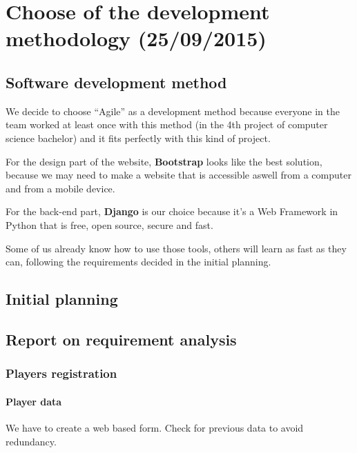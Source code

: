\section{Choose of the development methodology (25/09/2015)}

\subsection{Software development method}


We decide to choose \enquote{Agile} as a development method because
everyone in the team worked at least once with this method (in the 4th
project of computer science bachelor) and it fits perfectly with this
kind of project. \newline

For the design part of the website, \textbf{Bootstrap} looks like the
best solution, because we may need to make a website that is accessible
aswell from a computer and from a mobile device. \newline

For the back-end part, \textbf{Django} is our choice because it's a Web
Framework in Python that is free, open source, secure and fast.
\newline

Some of us already know how to use those tools, others will learn as
fast as they can, following the requirements decided in the initial
planning. \newline

\subsection{Initial planning}
\subsection{Report on requirement analysis}

\subsubsection{Players registration}

\paragraph{Player data}

We have to create a web based form. Check for previous data to avoid
redundancy. \newline

